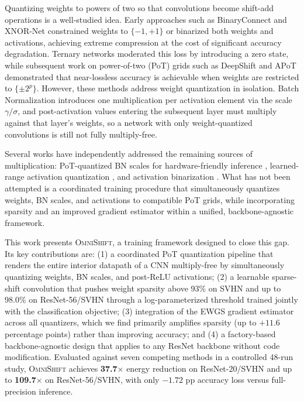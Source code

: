 \documentclass[12pt]{article}
\newcommand{\omnishift}{\textsc{OmniShift}}
\begin{document}
Quantizing weights to powers of two so that convolutions become shift-add operations is a well-studied idea. Early approaches such as BinaryConnect \cite{courbariaux2015binaryconnect} and XNOR-Net \cite{rastegari2016xnor} constrained weights to $\{-1, +1\}$ or binarized both weights and activations, achieving extreme compression at the cost of significant accuracy degradation. Ternary networks \cite{li2016twn,zhu2016ttq} moderated this loss by introducing a zero state, while subsequent work on power-of-two (PoT) grids such as DeepShift \cite{elhoushi2021deepshift} and APoT \cite{li2020apot} demonstrated that near-lossless accuracy is achievable when weights are restricted to $\{\pm 2^p\}$. However, these methods address weight quantization in isolation. Batch Normalization introduces one multiplication per activation element via the scale $\gamma/\sigma$, and post-activation values entering the subsequent layer must multiply against that layer's weights, so a network with only weight-quantized convolutions is still not fully multiply-free.

Several works have independently addressed the remaining sources of multiplication: PoT-quantized BN scales for hardware-friendly inference \cite{banner2018pobn}, learned-range activation quantization \cite{esser2020lsq,zhang2018lq}, and activation binarization \cite{rastegari2016xnor}. What has not been attempted is a coordinated training procedure that simultaneously quantizes weights, BN scales, and activations to compatible PoT grids, while incorporating sparsity and an improved gradient estimator within a unified, backbone-agnostic framework.

This work presents \omnishift{}, a training framework designed to close this gap. Its key contributions are: (1) a coordinated PoT quantization pipeline that renders the entire interior datapath of a CNN multiply-free by simultaneously quantizing weights, BN scales, and post-ReLU activations; (2) a learnable sparse-shift convolution that pushes weight sparsity above 93\% on SVHN and up to 98.0\% on ResNet-56/SVHN through a log-parameterized threshold trained jointly with the classification objective; (3) integration of the EWGS gradient estimator \cite{lee2021ewgs} across all quantizers, which we find primarily amplifies sparsity (up to $+11.6$ percentage points) rather than improving accuracy; and (4) a factory-based backbone-agnostic design that applies to any ResNet backbone without code modification. Evaluated against seven competing methods in a controlled 48-run study, \omnishift{} achieves \textbf{37.7$\times$} energy reduction on ResNet-20/SVHN and up to \textbf{109.7$\times$} on ResNet-56/SVHN, with only $-1.72$ pp accuracy loss versus full-precision inference.
\end{document}
